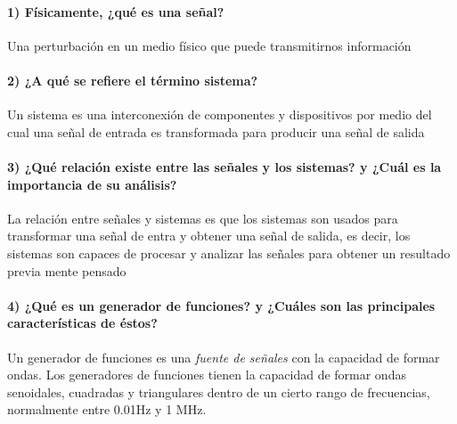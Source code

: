 \documentclass[10pt]{article}
\begin{document}
\setlength{\parindent}{25pt}

\paragraph{1) Físicamente, ¿qué es una señal? \\
}

Una perturbación en un medio físico que puede transmitirnos información

\paragraph{2) ¿A qué se refiere el término sistema?}

 Un sistema es una interconexión de componentes y dispositivos por medio  del  cual  una  señal  de  entrada  es  transformada  para  producir  una  señal  de  salida


\paragraph{3) ¿Qué relación existe entre las señales y los sistemas? y ¿Cuál es la importancia de su análisis?}

La relación entre señales y sistemas es que los sistemas son usados para transformar una señal de entra y obtener una señal de salida, es decir, los sistemas son capaces de procesar y analizar las señales para obtener un resultado previa mente pensado

\paragraph{4) ¿Qué es un generador de funciones? y ¿Cuáles son las principales características de éstos?}

Un generador de funciones es una \textit{fuente de señales} con la capacidad de formar ondas. Los generadores de funciones tienen la capacidad de formar ondas senoidales, cuadradas y triangulares dentro de un cierto rango de frecuencias, normalmente entre 0.01Hz y 1 MHz.	
\newline
\end{document}
